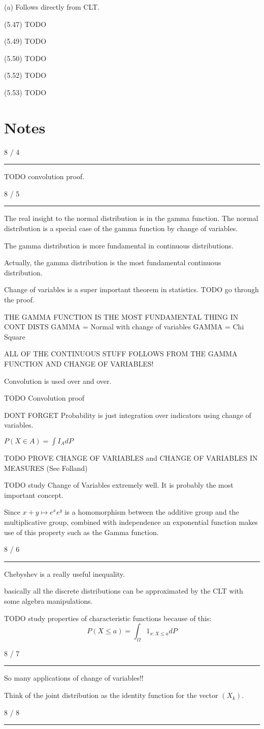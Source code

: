 \documentclass[12pt, reqno]{amsart}
\numberwithin{equation}{section}
\begin{document}
(a) Follows directly from CLT.

(5.47)
TODO

(5.49)
TODO

(5.50)
TODO

(5.52)
TODO

(5.53)
TODO


\section*{Notes}

8 / 4
\rule{\textwidth}{.5pt}

TODO convolution proof.

8 / 5
\rule{\textwidth}{.5pt}

The real insight to the normal distribution is in the gamma function. The normal distribution is a special case of the gamma function by change of variables.

The gamma distribution is more fundamental in continuous distributions.

Actually, the gamma distribution is the most fundamental continuous distribution.

Change of variables is a super important theorem in statistics. TODO go through the proof. 

THE GAMMA FUNCTION IS THE MOST FUNDAMENTAL THING IN CONT DISTS
GAMMA = Normal with change of variables
GAMMA = Chi Square

ALL OF THE CONTINUOUS STUFF FOLLOWS FROM THE GAMMA FUNCTION AND CHANGE OF VARIABLES!

Convolution is used over and over.

TODO Convolution proof

DONT FORGET
Probability is just integration over indicators using change of variables.

$P(X \in A) = \int I_A dP$

TODO PROVE CHANGE OF VARIABLES and CHANGE OF VARIABLES IN MEASURES (See Folland)

TODO study Change of Variables extremely well. It is probably the most important concept.

Since $x + y \mapsto e^x e^y$ is a homomorphism between the additive group and the multiplicative group, combined with independence an exponential function makes use of this property such as the Gamma function.

8 / 6
\rule{\textwidth}{.5pt}

Chebyshev is a really useful inequality.

basically all the discrete distributions can be approximated by the CLT with some algebra manipulations.

TODO study properties of characteristic functions because of this:
\[
P(X \le a) = \int_{\Omega} 1_{x : X \le a} dP
\]

8 / 7
\rule{\textwidth}{.5pt}

So many applications of change of variables!!

Think of the joint distribution as the identity function for the vector $(X_k)$.

8 / 8
\rule{\textwidth}{.5pt}
\end{document}
